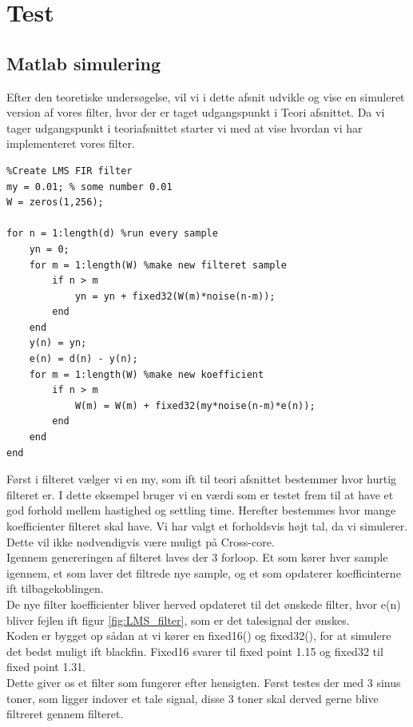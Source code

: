 \graphicspath{{Chapters/Test/}}


\section{Test}

\subsection{Matlab simulering}

Efter den teoretiske undersøgelse, vil vi i dette afsnit udvikle og vise en simuleret version af vores filter, hvor der er taget udgangspunkt i Teori afsnittet. Da vi tager udgangspunkt i teoriafsnittet starter vi med at vise hvordan vi har implementeret vores filter. 

\begin{lstlisting}
%Create LMS FIR filter
my = 0.01; % some number 0.01
W = zeros(1,256);

for n = 1:length(d) %run every sample 
    yn = 0;
    for m = 1:length(W) %make new filteret sample 
        if n > m
            yn = yn + fixed32(W(m)*noise(n-m));
        end
    end
    y(n) = yn;
    e(n) = d(n) - y(n);
    for m = 1:length(W) %make new koefficient  
        if n > m
            W(m) = W(m) + fixed32(my*noise(n-m)*e(n));
        end
    end
end
\end{lstlisting}

Først i filteret vælger vi en my, som ift til teori afsnittet bestemmer hvor hurtig filteret er. I dette eksempel bruger vi en værdi som er testet frem til at have et god forhold mellem hastighed og settling time. Herefter bestemmes hvor mange koefficienter filteret skal have. Vi har valgt et forholdsvis højt tal, da vi simulerer. Dette vil ikke nødvendigvis være muligt på Cross-core. \\

Igennem genereringen af filteret laves der 3 forloop. Et som kører hver sample igennem, et som laver det filtrede nye sample, og et som opdaterer koefficinterne ift tilbagekoblingen. \\
De nye filter koefficienter bliver herved opdateret til det ønskede filter, hvor e(n) bliver fejlen ift figur \ref{fig:LMS_filter}, som er det talesignal der ønskes. \\
Koden er bygget op sådan at vi kører en fixed16() og fixed32(), for at simulere det bedst muligt ift blackfin. Fixed16 svarer til fixed point 1.15 og fixed32 til fixed point 1.31. 
\\
Dette giver os et filter som fungerer efter hensigten. Først testes der med 3 sinus toner, som ligger indover et tale signal, disse 3 toner skal derved gerne blive filtreret gennem filteret. 
\newpage
